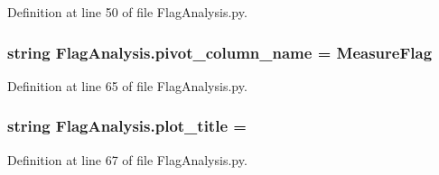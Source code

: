 Definition at line 50 of file Flag\+Analysis.\+py.

\hypertarget{namespace_flag_analysis_a39d797833bc2634e7f4c497cf090bc66}{}
\subsubsection[{pivot\+\_\+column\+\_\+name}]{\setlength{\rightskip}{0pt plus 5cm}string Flag\+Analysis.\+pivot\+\_\+column\+\_\+name = \textquotesingle{}Measure\+Flag\textquotesingle{}}\label{namespace_flag_analysis_a39d797833bc2634e7f4c497cf090bc66}


Definition at line 65 of file Flag\+Analysis.\+py.

\hypertarget{namespace_flag_analysis_abd038dc9d4b0dae57d6f4ba4218b8f3a}{}
\subsubsection[{plot\+\_\+title}]{\setlength{\rightskip}{0pt plus 5cm}string Flag\+Analysis.\+plot\+\_\+title = \textquotesingle{} \textquotesingle{}}\label{namespace_flag_analysis_abd038dc9d4b0dae57d6f4ba4218b8f3a}


Definition at line 67 of file Flag\+Analysis.\+py.

